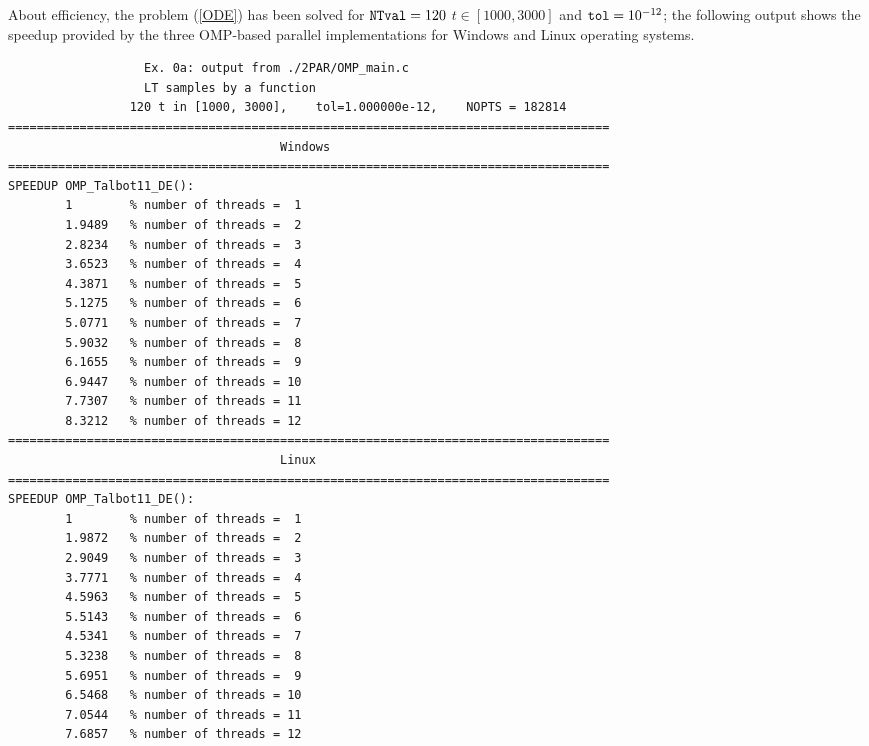\documentclass[a4paper,10pt]{report}%
\begin{document}
About efficiency, the problem (\ref{ODE}) has been solved for ${\tt NTval}=120$ $t\in[1000,3000]$ and
${\tt tol}=10^{-12}$; the following output shows the speedup provided by the three OMP-based parallel
implementations for Windows and Linux operating systems.
\begin{lstlisting}
                   Ex. 0a: output from ./2PAR/OMP_main.c
                   LT samples by a function
                 120 t in [1000, 3000],    tol=1.000000e-12,    NOPTS = 182814
====================================================================================
                                      Windows
====================================================================================
SPEEDUP OMP_Talbot11_DE():
        1        % number of threads =  1
        1.9489   % number of threads =  2
        2.8234   % number of threads =  3
        3.6523   % number of threads =  4
        4.3871   % number of threads =  5
        5.1275   % number of threads =  6
        5.0771   % number of threads =  7
        5.9032   % number of threads =  8
        6.1655   % number of threads =  9
        6.9447   % number of threads = 10
        7.7307   % number of threads = 11
        8.3212   % number of threads = 12
====================================================================================
                                      Linux
====================================================================================
SPEEDUP OMP_Talbot11_DE():
        1        % number of threads =  1
        1.9872   % number of threads =  2
        2.9049   % number of threads =  3
        3.7771   % number of threads =  4
        4.5963   % number of threads =  5
        5.5143   % number of threads =  6
        4.5341   % number of threads =  7
        5.3238   % number of threads =  8
        5.6951   % number of threads =  9
        6.5468   % number of threads = 10
        7.0544   % number of threads = 11
        7.6857   % number of threads = 12


\end{lstlisting}
\end{document}
